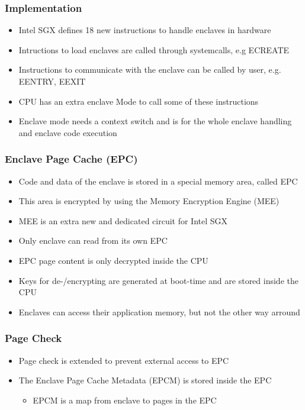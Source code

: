 \begin{frame}
    \frametitle{Implementation}
    \begin{itemize}[<+->]
        \item Intel SGX defines 18 new instructions to handle enclaves in hardware
        \item Intructions to load enclaves are called through systemcalls, e.g ECREATE
        \item Instructions to communicate with the enclave can be called by user, e.g. EENTRY, EEXIT
        \item CPU has an extra enclave Mode to call some of these instructions
        \item Enclave mode needs a context switch and is for the whole enclave handling and enclave code execution
    \end{itemize}
\end{frame}

\begin{frame}
    \frametitle{Enclave Page Cache (EPC)}
    \begin{itemize}[<+->]
        \item Code and data of the enclave is stored in a special memory area, called EPC
        \item This area is encrypted by using the Memory Encryption Engine (MEE)
        \item MEE is an extra new and dedicated circuit for Intel SGX
        \item Only enclave can read from its own EPC
        \item EPC page content is only decrypted inside the CPU
        \item Keys for de-/encrypting are generated at boot-time and are stored inside the CPU
        \item Enclaves can access their application memory, but not the other way arround
    \end{itemize}
\end{frame}

\begin{frame}
    \frametitle{Page Check}
    \begin{itemize}[<+->]
        \item Page check is extended to prevent external access to EPC
        \item The Enclave Page Cache Metadata (EPCM) is stored inside the EPC
        \begin{itemize}
            \item EPCM is a map from enclave to pages in the EPC
        \end{itemize}
    \end{itemize}
\end{frame}

